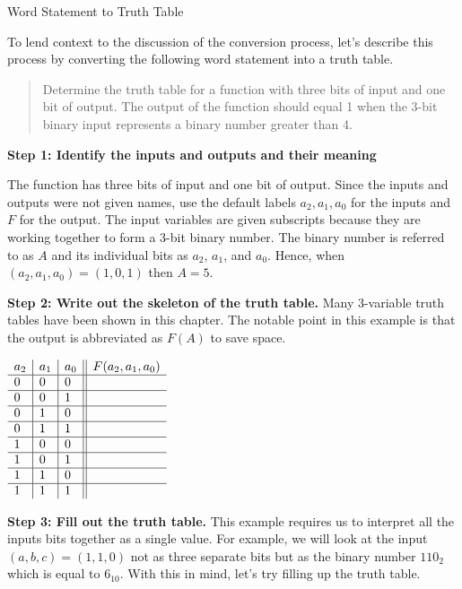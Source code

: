 \begin{process}{Word Statement to Truth Table}
\label{process:representationWStoTT}

To lend context to the discussion of the conversion process, let's describe this
process by converting the following word statement into a truth table.

\begin{quote}
Determine the truth table for a function with three bits of input and
one bit of output.  The output of the function should equal 1 when
the 3-bit binary input represents a binary number greater than 4.
\end{quote}

\textbf{Step 1: Identify the inputs and outputs and their meaning}

The function has three bits of input and one bit of output.
Since the inputs and outputs were not given names, use the default labels
$a_2,a_1,a_0$ for the inputs and $F$ for the output.  The input
variables are given subscripts because they are working together to
form a 3-bit binary number.  The binary number is referred to as
$A$ and its individual bits as $a_2$, $a_1$, and $a_0$.  Hence,
when $(a_2,a_1,a_0) = (1,0,1)$ then $A=5$.

\textbf{Step 2: Write out the skeleton of the truth table.}
Many 3-variable truth tables have been shown in this
chapter.  The notable point in this example is that the output is
abbreviated as $F(A)$ to save space.

$
\begin{array}[ht]{l|l|l||l}
a_2 & a_1 & a_0 & F(a_2, a_1, a_0)        \\ \hline
0   & 0   & 0   &        \\ \hline
0   & 0   & 1   &        \\ \hline
0   & 1   & 0   &        \\ \hline
0   & 1   & 1   &        \\ \hline
1   & 0   & 0   &        \\ \hline
1   & 0   & 1   &        \\ \hline
1   & 1   & 0   &        \\ \hline
1   & 1   & 1   &        \\
\end{array}$

\textbf{Step 3: Fill out the truth table.}
This example requires us to interpret all the inputs bits together as a single value.
For example, we will look at the input $(a,b,c) = (1,1,0)$ not as three separate bits
but as the binary number $110_2$ which is equal to $6_{10}$. With this in mind,
let's try filling up the truth table.


\end{process}
